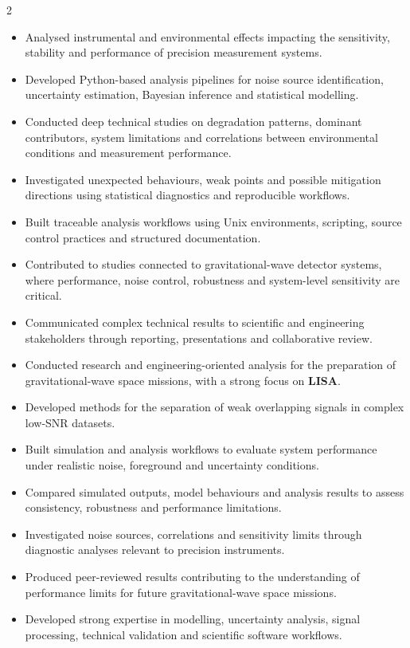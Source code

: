 \documentclass[8pt,a4paper,ragged2e,withhyper]{altacv}
\begin{document}
\begin{paracol}{2}

\begin{itemize}
\item Analysed instrumental and environmental effects impacting the sensitivity, stability and performance of precision measurement systems.
\item Developed Python-based analysis pipelines for noise source identification, uncertainty estimation, Bayesian inference and statistical modelling.
\item Conducted deep technical studies on degradation patterns, dominant contributors, system limitations and correlations between environmental conditions and measurement performance.
\item Investigated unexpected behaviours, weak points and possible mitigation directions using statistical diagnostics and reproducible workflows.
\item Built traceable analysis workflows using Unix environments, scripting, source control practices and structured documentation.
\item Contributed to studies connected to gravitational-wave detector systems, where performance, noise control, robustness and system-level sensitivity are critical.
\item Communicated complex technical results to scientific and engineering stakeholders through reporting, presentations and collaborative review.
\end{itemize}

\divider
\newpage


\begin{itemize}
\item Conducted research and engineering-oriented analysis for the preparation of gravitational-wave space missions, with a strong focus on \textbf{LISA}.
\item Developed methods for the separation of weak overlapping signals in complex low-SNR datasets.
\item Built simulation and analysis workflows to evaluate system performance under realistic noise, foreground and uncertainty conditions.
\item Compared simulated outputs, model behaviours and analysis results to assess consistency, robustness and performance limitations.
\item Investigated noise sources, correlations and sensitivity limits through diagnostic analyses relevant to precision instruments.
\item Produced peer-reviewed results contributing to the understanding of performance limits for future gravitational-wave space missions.
\item Developed strong expertise in modelling, uncertainty analysis, signal processing, technical validation and scientific software workflows.
\end{itemize}


\end{paracol}
\end{document}
